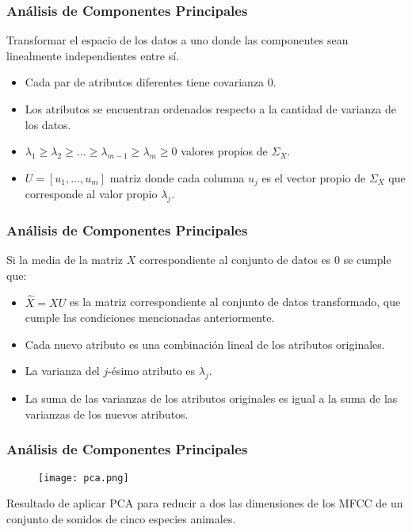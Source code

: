 \begin{frame}
    \frametitle{Análisis de Componentes Principales}

    \begin{block}{Transformar el espacio de los datos a uno donde las componentes sean linealmente independientes entre sí.}
        \begin{itemize}
            \item<2-> Cada par de atributos diferentes tiene covarianza 0.
            \item<3-> Los atributos se encuentran ordenados respecto a la cantidad de varianza de los datos.
        \end{itemize}
    \end{block}

    \begin{itemize}
        \item<4-> $\lambda_1 \geq \lambda_2 \geq \dots \geq \lambda_{m-1} \geq \lambda_{m} \geq 0$ valores propios de $\Sigma_X$.
        \item<5-> $U = [u_1,\dots,u_m]$ matriz donde cada columna $u_j$ es el vector propio de $\Sigma_X$ que corresponde al valor propio $\lambda_j$.
    \end{itemize}
\end{frame}

\begin{frame}
    \frametitle{Análisis de Componentes Principales}

    \begin{block}{Si la media de la matriz $X$ correspondiente al conjunto de datos es 0 se cumple que:}
        \begin{itemize}
            \item<2-> $\hat{X} = XU$ es la matriz correspondiente al conjunto de datos transformado, que cumple las condiciones mencionadas anteriormente.
            \item<3-> Cada nuevo atributo es una combinación lineal de los atributos originales.
            \item<4-> La varianza del $j$-ésimo atributo es $\lambda_j$.
            \item<5-> La suma de las varianzas de los atributos originales es igual a la suma de las varianzas de los nuevos atributos.
        \end{itemize}
    \end{block}
\end{frame}

\begin{frame}
    \frametitle{Análisis de Componentes Principales}

    \begin{figure}[!h]
        \centering
        \texttt{[image: pca.png]}
    \end{figure}

    {\footnotesize
    Resultado de aplicar PCA para reducir a dos las dimensiones de los MFCC de un conjunto de sonidos de cinco especies animales.
    }
\end{frame}


